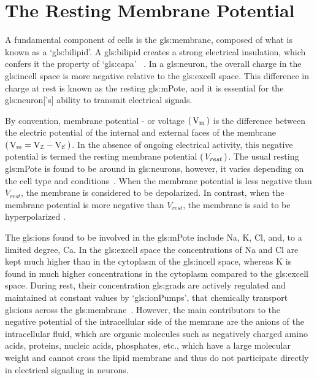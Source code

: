 \documentclass[class={myRUCProject}, crop=false]{standalone}
\begin{document}
\section{The Resting Membrane Potential} 
A fundamental component of cells is the \gls{gls:membrane}, composed of what is known as a `\gls{gls:bilipid}'\footnotemark. A \gls{gls:bilipid} creates a strong electrical insulation, 
which confers it the property of `\gls{gls:capa}'~\cite{}
.  
In a \gls{gls:neuron}, the overall charge in the \gls{gls:incell} space is more negative relative to the \gls{gls:excell} space. This difference in charge at rest is known as the resting \gls{gls:mPote}, and it is essential for the \gls{gls:neuron}['s] ability to transmit electrical signals. 

By convention, membrane potential - or voltage \(\br{\unit{\V\membrane}}\) is the difference between the electric potential of the internal and external faces of the membrane \(\br{\unit{\V\membrane}=\unit{\V\incell}-\unit{\V\excell}}\). In the absence of ongoing electrical activity, this negative potential is termed the resting membrane potential \(\br{V_{rest}}\).  The usual resting \gls{gls:mPote} is found to be around  in \glspl{gls:neuron}, however, it varies depending on the cell type and conditions~\cite{}. When the membrane potential is less negative than  \(V_{rest}\), the membrane is considered to be depolarized. In contrast, when the membrane potential is more negative than \(V_{rest}\), the membrane is said to be hyperpolarized \cite{Hammond2015ch3}. 

The \glspl{gls:ion} found to be involved in the \gls{gls:mPote} include \gls{Na}, \gls{K}, \gls{Cl}, and, to a limited degree, \gls{Ca}. 
In the \gls{gls:excell} space the concentrations of \gls{Na} and  \gls{Cl} are kept much higher than in the cytoplasm of the \gls{gls:incell} space, whereas \gls{K} is found in much higher concentrations in the cytoplasm compared to the \gls{gls:excell} space. During rest, their concentration \glspl{gls:grad} are actively regulated and maintained at constant values by `\glspl{gls:ionPump}', that chemically transport \glspl{gls:ion} across the \gls{gls:membrane}~\cite{}. However, the main contributors to the negative potential of the intracellular side of the memrane are the anions of the intracellular fluid, which are organic molecules such as negatively charged amino acids, proteins, nucleic acids, phosphates, etc., which have a large molecular weight and cannot cross the lipid membrane and thus do not participate directly in electrical signaling in neurons\cite{Hammond2015ch3}. 
\end{document}

